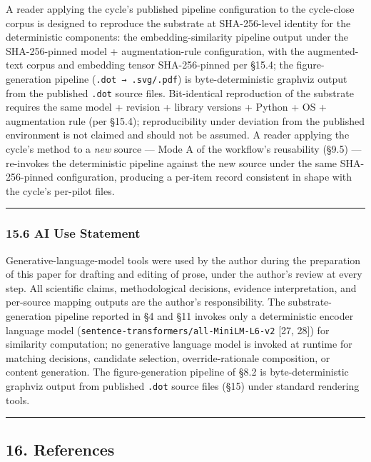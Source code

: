 \documentclass[
]{article}
\begin{document}
A reader applying the cycle's published pipeline configuration to the
cycle-close corpus is designed to reproduce the substrate at
SHA-256-level identity for the deterministic components: the
embedding-similarity pipeline output under the SHA-256-pinned model +
augmentation-rule configuration, with the augmented-text corpus and
embedding tensor SHA-256-pinned per §15.4; the figure-generation
pipeline (\texttt{.dot\ →\ .svg/.pdf}) is byte-deterministic graphviz
output from the published \texttt{.dot} source files. Bit-identical
reproduction of the substrate requires the same model + revision +
library versions + Python + OS + augmentation rule (per §15.4);
reproducibility under deviation from the published environment is not
claimed and should not be assumed. A reader applying the cycle's method
to a \emph{new} source --- Mode A of the workflow's reusability (§9.5)
--- re-invokes the deterministic pipeline against the new source under
the same SHA-256-pinned configuration, producing a per-item record
consistent in shape with the cycle's per-pilot files.

\begin{center}\rule{0.5\linewidth}{0.5pt}\end{center}

\subsubsection{15.6 AI Use Statement}\label{ai-use-statement}

Generative-language-model tools were used by the author during the
preparation of this paper for drafting and editing of prose, under the
author's review at every step. All scientific claims, methodological
decisions, evidence interpretation, and per-source mapping outputs are
the author's responsibility. The substrate-generation pipeline reported
in §4 and §11 invokes only a deterministic encoder language model
(\texttt{sentence-transformers/all-MiniLM-L6-v2} {[}27, 28{]}) for
similarity computation; no generative language model is invoked at
runtime for matching decisions, candidate selection, override-rationale
composition, or content generation. The figure-generation pipeline of
§8.2 is byte-deterministic graphviz output from published \texttt{.dot}
source files (§15) under standard rendering tools.

\begin{center}\rule{0.5\linewidth}{0.5pt}\end{center}

\subsection{16. References}\label{references}
\end{document}
